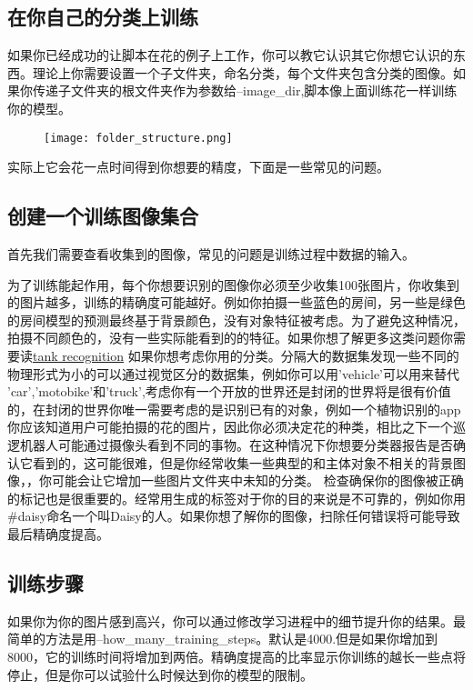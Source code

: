\subsection{在你自己的分类上训练}
如果你已经成功的让脚本在花的例子上工作，你可以教它认识其它你想它认识的东西。理论上你需要设置一个子文件夹，命名分类，每个文件夹包含分类的图像。如果你传递子文件夹的根文件夹作为参数给--image\_dir,脚本像上面训练花一样训练你的模型。
\begin{center}
\begin{figure}
	
\centering
\texttt{[image: folder\_structure.png]}
\end{figure}
\end{center}
实际上它会花一点时间得到你想要的精度，下面是一些常见的问题。
\subsection{创建一个训练图像集合}
首先我们需要查看收集到的图像，常见的问题是训练过程中数据的输入。

为了训练能起作用，每个你想要识别的图像你必须至少收集100张图片，你收集到的图片越多，训练的精确度可能越好。例如你拍摄一些蓝色的房间，另一些是绿色的房间模型的预测最终基于背景颜色，没有对象特征被考虑。为了避免这种情况，拍摄不同颜色的，没有一些实际能看到的的特征。如果你想了解更多这类问题你需要读\href{http://www.jefftk.com/p/detecting-tanks}{tank recognition}
如果你想考虑你用的分类。分隔大的数据集发现一些不同的物理形式为小的可以通过视觉区分的数据集，例如你可以用'vehicle'可以用来替代
'car','motobike'和'truck',考虑你有一个开放的世界还是封闭的世界将是很有价值的，在封闭的世界你唯一需要考虑的是识别已有的对象，例如一个植物识别的app你应该知道用户可能拍摄的花的图片，因此你必须决定花的种类，相比之下一个巡逻机器人可能通过摄像头看到不同的事物。在这种情况下你想要分类器报告是否确认它看到的，这可能很难，但是你经常收集一些典型的和主体对象不相关的背景图像，，你可能会让它增加一些图片文件夹中未知的分类。
检查确保你的图像被正确的标记也是很重要的。经常用生成的标签对于你的目的来说是不可靠的，例如你用\#daisy命名一个叫Daisy的人。如果你想了解你的图像，扫除任何错误将可能导致最后精确度提高。
\subsection{训练步骤}
如果你为你的图片感到高兴，你可以通过修改学习进程中的细节提升你的结果。最简单的方法是用--how\_many\_training\_steps。默认是4000.但是如果你增加到8000，它的训练时间将增加到两倍。精确度提高的比率显示你训练的越长一些点将停止，但是你可以试验什么时候达到你的模型的限制。
